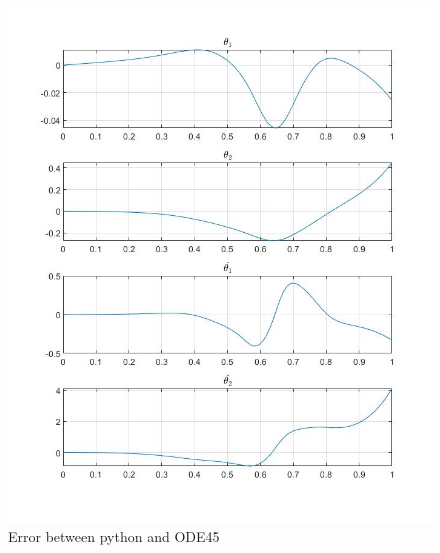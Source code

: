 \documentclass{beamer}
\begin{document}
\begin{frame}
\begin{itemize}
\begin{figure}
\begin{multicols}{2}
                    \includegraphics[scale=.18]{Figs/nonlinear_error_ode45.jpg}
                    \caption{Error between python and ODE45}
                \end{multicols}
            \end{figure}
        \end{itemize}
    \end{frame}
\end{document}
